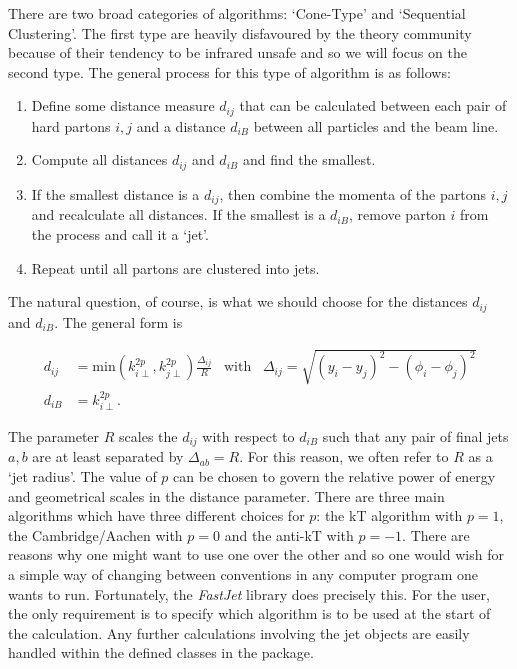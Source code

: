 There are two broad categories of algorithms: `Cone-Type' and `Sequential Clustering'. The first type are heavily disfavoured by the theory community because of their tendency to be infrared unsafe and so we will focus on the second type. The general process for this type of algorithm is as follows:

\begin{enumerate}
\item{Define some distance measure $d_{ij}$ that can be calculated between each pair of hard partons $i,j$ and a distance $d_{iB}$ between all particles and the beam line.}
\item{Compute all distances $d_{ij}$ and $d_{iB}$ and find the smallest.}
\item{If the smallest distance is a $d_{ij}$, then combine the momenta of the partons $i, j$ and recalculate all distances. If the smallest is a $d_{iB}$, remove parton $i$ from the process and call it a `jet'.}
\item{Repeat until all partons are clustered into jets.}
\end{enumerate}

The natural question, of course, is what we should choose for the distances $d_{ij}$ and $d_{iB}$. The general form is

\begin{equation}
\begin{split}
d_{ij} &= \text{min}\left(k_{i \perp}^{2p},k_{j \perp}^{2p} \right) \frac{\Delta_{ij}}{R} \hspace{10pt} \text{with} \hspace{10pt} \Delta_{ij} = \sqrt{(y_i - y_j)^2 - (\phi_i - \phi_j)^2} \\
d_{iB} &= k_{i \perp}^{2p}.
\end{split}
\end{equation}

The parameter $R$ scales the $d_{ij}$ with respect to $d_{iB}$ such that any pair of final jets $a, b$ are at least separated by $\Delta_{ab} = R$. For this reason, we often refer to $R$ as a `jet radius'. The value of $p$ can be chosen to govern the relative power of energy and geometrical scales in the distance parameter. There are three main algorithms which have three different choices for $p$: the kT algorithm with $p =1$, the Cambridge/Aachen with $p=0$ and the anti-kT with $p = -1$. There are reasons why one might want to use one over the other and so one would wish for a simple way of changing between conventions in any computer program one wants to run. Fortunately, the \emph{FastJet} library \cite{Cacciari2012} does precisely this. For the user, the only requirement is to specify which algorithm is to be used at the start of the calculation. Any further calculations involving the jet objects are easily handled within the defined classes in the package. 

